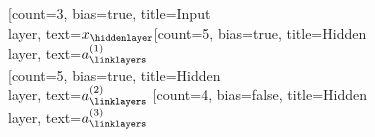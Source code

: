 \documentclass{article}
\begin{document}
\begin{neuralnetwork}[height=6]
  \newcommand{\x}[2]{$x_#2$}
  \newcommand{\hfirst}[2]{\small $a^{(1)}_#2$}
  \newcommand{\hsecond}[2]{\small $a^{(2)}_#2$}
  \newcommand{\hthird}[2]{\small $a^{(3)}_#2$}
  [count=3, bias=true, title=Input\\layer, text=\x]
  \hiddenlayer[count=5, bias=true, title=Hidden\\layer, text=\hfirst] \linklayers\\
  \hiddenlayer[count=5, bias=true, title=Hidden\\layer, text=\hsecond] \linklayers
  \hiddenlayer[count=4, bias=false, title=Hidden\\layer, text=\hthird] \linklayers
\end{neuralnetwork}
\end{document}
